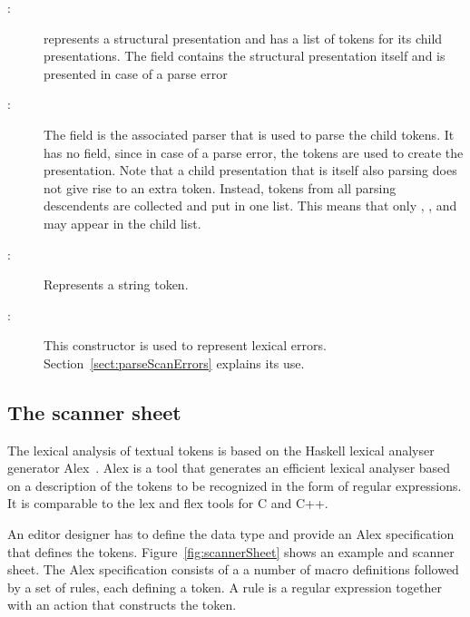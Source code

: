 \documentclass[12pt]{article}
\begin{document}
\begin{description}
\item[:] represents a structural presentation and has a list of tokens for its child presentations. The  field contains the structural presentation itself and is presented in case of a parse error   \\
\item[:] The field  is the associated parser that is used to parse the child tokens. It has no  field, since in case of a parse error, the tokens are used to create the presentation. Note that a child presentation that is itself also parsing does not give rise to an extra  token. Instead, tokens from all parsing descendents are collected and put in one list. This means that only , , and  may appear in the child list. \\
\item[:] Represents a string token.  \\
\item[:] This constructor is used to represent lexical errors. Section~\ref{sect:parseScanErrors} explains its use. \\
\end{description}




\subsection{The scanner sheet}

The lexical analysis of textual tokens is based on the Haskell lexical analyser generator Alex~\cite{marlow07alex}. Alex is a tool that generates an efficient lexical analyser based on a description of the tokens to be recognized in the form of regular expressions. It is comparable to the lex and flex tools for C and C++.

An editor designer has to define the data type  and provide an Alex specification that defines the tokens. Figure~\ref{fig:scannerSheet} shows an example  and scanner sheet. The Alex specification consists of a a number of macro definitions followed by a set of rules, each defining a token. A rule is a regular expression together with an action that constructs the token.
\end{document}
